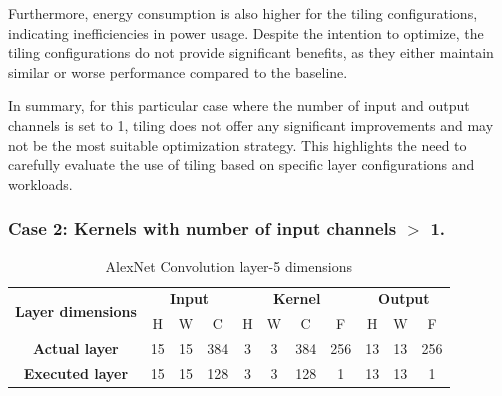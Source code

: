 Furthermore, energy consumption is also higher for the tiling configurations, indicating inefficiencies in power usage. Despite the intention to optimize, the tiling configurations do not provide significant benefits, as they either maintain similar or worse performance compared to the baseline.

In summary, for this particular case where the number of input and output channels is set to 1, tiling does not offer any significant improvements and may not be the most suitable optimization strategy. This highlights the need to carefully evaluate the use of tiling based on specific layer configurations and workloads.

\subsubsection{Case 2: Kernels with number of input channels $>$ 1.}

\begin{table}[H]
\centering
\caption{AlexNet Convolution layer-5 dimensions}
\label{tab:tileConvolutionCase2Dim}
 \begin{tabular}{|c|c|c|c|c|c|c|c|c|c|c|} \hline  
 
 \multirow{2}{*}{\textbf{Layer dimensions}} &  
 \multicolumn{3}{|c|}{\textbf{Input}} &  
 \multicolumn{4}{|c|}{\textbf{Kernel}} &  
 \multicolumn{3}{|c|}{\textbf{Output}}\\ \cline{2-11}
 & H &  W &  C&  H &  W &  C &  F &  H &  W & F\\ \hline  
 \textbf{Actual layer} &  15 & 15 & 384 & 3 & 3 & 384 & 256 & 13 & 13 & 256\\ \hline 
 \textbf{Executed layer} & 15 & 15 &  \cellcolor{yellow}128 & 3 & 3 & 128 & \cellcolor{yellow}1 & 13 & 13 & \cellcolor{yellow}1 \\ \hline 
 \end{tabular}
\end{table}

